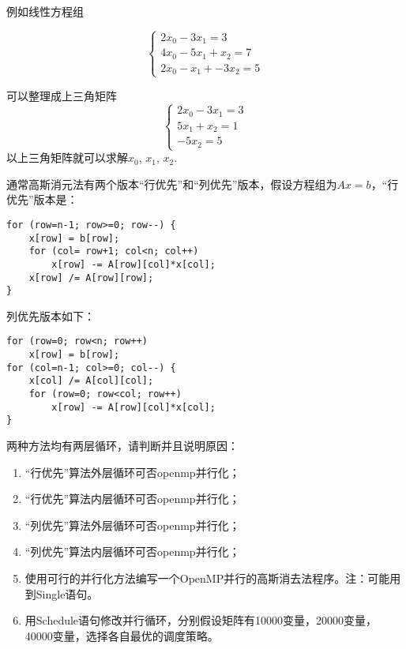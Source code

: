 \documentclass{ctexart}
\begin{document}
例如线性方程组

\begin{equation}
  \left\{
   \begin{array}{c}
   2x_0 - 3x_1 = 3  \\
   4x_0 - 5x_1 + x_2 = 7  \\
   2x_0 - x_1 + -3x_2 = 5  
   \end{array}
  \right.
\end{equation}

可以整理成上三角矩阵
\begin{equation}
  \left\{
   \begin{array}{c}
   2x_0 - 3x_1 = 3  \\
   5x_1 + x_2 = 1  \\
   -5x_2 = 5  
   \end{array}
  \right.
\end{equation}
以上三角矩阵就可以求解$x_0$, $x_1$, $x_2$.

通常高斯消元法有两个版本“行优先”和“列优先”版本，假设方程组为$Ax=b$，“行优先”版本是：
\begin{lstlisting}
for (row=n-1; row>=0; row--) {
	x[row] = b[row];
	for (col= row+1; col<n; col++)
		x[row] -= A[row][col]*x[col];
	x[row] /= A[row][row];
}
\end{lstlisting}
列优先版本如下：
\begin{lstlisting}
for (row=0; row<n; row++)
    x[row] = b[row];
for (col=n-1; col>=0; col--) {
    x[col] /= A[col][col];
    for (row=0; row<col; row++)
        x[row] -= A[row][col]*x[col];
}
\end{lstlisting}

两种方法均有两层循环，请判断并且说明原因：
\begin{enumerate}[label=(\alph*)]
\item “行优先”算法外层循环可否openmp并行化；
\item “行优先”算法内层循环可否openmp并行化；
\item “列优先”算法外层循环可否openmp并行化；
\item “列优先”算法内层循环可否openmp并行化；
\item 使用可行的并行化方法编写一个OpenMP并行的高斯消去法程序。注：可能用到Single语句。
\item 用Schedule语句修改并行循环，分别假设矩阵有10000变量，20000变量，40000变量，选择各自最优的调度策略。
\end{enumerate}
\end{document}
